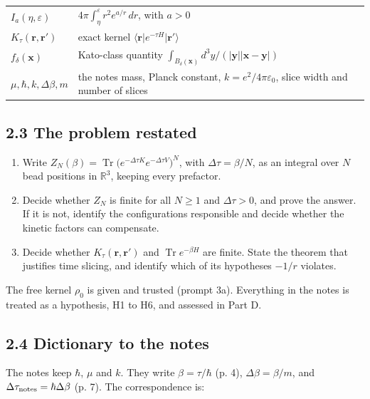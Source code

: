 \documentclass[11pt,a4paper]{article}
\begin{document}
\begin{longtable}[]{@{}
  >{\raggedright\arraybackslash}p{}
  >{\raggedright\arraybackslash}p{}@{}}
\(I_a(\eta,\varepsilon)\) & \(4\pi\int_\eta^\varepsilon r^2e^{a/r}\,dr\), with \(a>0\) \\
\(K_\tau(\mathbf r,\mathbf r')\) & exact kernel \(\langle\mathbf r\rvert e^{-\tau H}\lvert\mathbf r'\rangle\) \\
\(f_\delta(\mathbf x)\) & Kato-class quantity \(\int_{B_\delta(\mathbf x)}d^3y/(\lvert\mathbf y\rvert\lvert\mathbf x-\mathbf y\rvert)\) \\
\(\mu,\hbar,k,\Delta\beta,m\) & the notes\textquotesingle{} mass, Planck constant, \(k=e^2/4\pi\varepsilon_0\), slice width and number of slices \\
\end{longtable}

\hypertarget{the-problem-restated}{%
\subsection{2.3 The problem restated}\label{the-problem-restated}}

\begin{enumerate}
\def\labelenumi{(\alph{enumi})}
\item
  Write \(Z_N(\beta)=\operatorname{Tr}\big(e^{-\Delta\tau K}e^{-\Delta\tau V}\big)^N\), with \(\Delta\tau=\beta/N\), as an integral over \(N\) bead positions in \(\mathbb R^3\), keeping every prefactor.
\item
  Decide whether \(Z_N\) is finite for all \(N\ge1\) and \(\Delta\tau>0\), and prove the answer. If it is not, identify the configurations responsible and decide whether the kinetic factors can compensate.
\item
  Decide whether \(K_\tau(\mathbf r,\mathbf r')\) and \(\operatorname{Tr}e^{-\beta H}\) are finite. State the theorem that justifies time slicing, and identify which of its hypotheses \(-1/r\) violates.
\end{enumerate}

The free kernel \(\rho_0\) is given and trusted (prompt 3a). Everything in the notes is treated as a hypothesis, H1 to H6, and assessed in Part D.

\hypertarget{dictionary-to-the-notes}{%
\subsection{2.4 Dictionary to the notes}\label{dictionary-to-the-notes}}

The notes keep \(\hbar\), \(\mu\) and \(k\). They write \(\beta=\tau/\hbar\) (p. 4), \(\Delta\beta=\beta/m\), and \(\Delta\tau_{\rm notes}=\hbar\Delta\beta\) (p. 7). The correspondence is:
\end{document}
